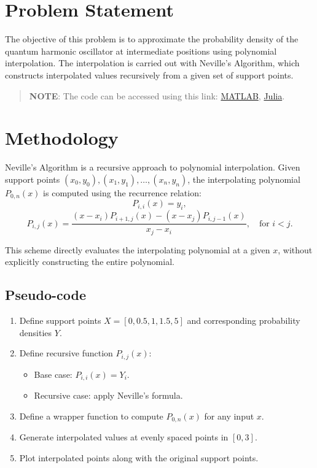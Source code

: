 \section*{Problem Statement}
The objective of this problem is to approximate the probability density of the
quantum harmonic oscillator at intermediate positions using polynomial interpolation.
The interpolation is carried out with Neville's Algorithm, which constructs
interpolated values recursively from a given set of support points.

\begin{quote}
  \textbf{NOTE}: The code can be accessed using this link: \href{https://raw.githubusercontent.com/HavokSahil/computational-techniques-assignments/refs/heads/main/assignment4/a4.m}{MATLAB}, \href{https://raw.githubusercontent.com/HavokSahil/computational-techniques-assignments/refs/heads/main/assignment4/a4.jl}{Julia}.
\end{quote}


\section*{Methodology}
Neville’s Algorithm is a recursive approach to polynomial interpolation. Given
support points $(x_0, y_0), (x_1, y_1), \dots, (x_n, y_n)$, the interpolating
polynomial $P_{0,n}(x)$ is computed using the recurrence relation:
\[
P_{i,i}(x) = y_i,
\]
\[
P_{i,j}(x) = \frac{(x - x_i)P_{i+1,j}(x) - (x - x_j)P_{i,j-1}(x)}{x_j - x_i},
\quad \text{for } i < j.
\]

This scheme directly evaluates the interpolating polynomial at a given $x$,
without explicitly constructing the entire polynomial.

\subsection*{Pseudo-code}
\begin{enumerate}
  \item Define support points $X = [0, 0.5, 1, 1.5, 5]$ and corresponding
        probability densities $Y$.
  \item Define recursive function $P_{i,j}(x)$:
  \begin{itemize}
    \item Base case: $P_{i,i}(x) = Y_i$.
    \item Recursive case: apply Neville’s formula.
  \end{itemize}
  \item Define a wrapper function to compute $P_{0,n}(x)$ for any input $x$.
  \item Generate interpolated values at evenly spaced points in $[0,3]$.
  \item Plot interpolated points along with the original support points.
\end{enumerate}

